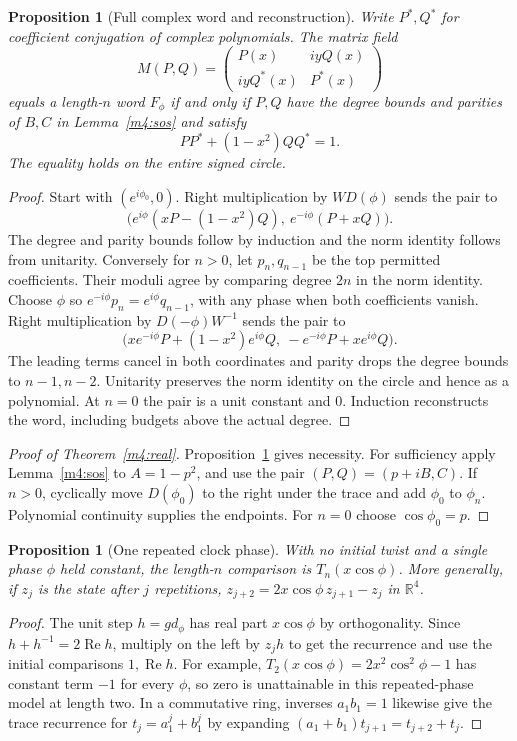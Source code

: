 \documentclass[11pt,reqno]{amsart}
\newtheorem{proposition}[theorem]{Proposition}
\theoremstyle{definition}
\theoremstyle{remark}
\numberwithin{equation}{section}
\newcommand{\R}{\mathbb{R}}
\newcommand{\re}{\operatorname{Re}}
\begin{document}
\begin{proposition}[Full complex word and reconstruction]\label{m4:pair}
Write $P^*,Q^*$ for coefficient conjugation of complex polynomials. The matrix field
\[
 M(P,Q)=\begin{pmatrix}P(x)&iyQ(x)\\iyQ^*(x)&P^*(x)\end{pmatrix}
\]
equals a length-$n$ word $F_\phi$ if and only if $P,Q$ have the degree bounds and parities of $B,C$ in Lemma~\ref{m4:sos} and satisfy
\[
 PP^*+(1-x^2)QQ^*=1.
\]
The equality holds on the entire signed circle.
\end{proposition}
\begin{proof}
Start with $(e^{i\phi_0},0)$. Right multiplication by $WD(\phi)$ sends the pair to
\[
 \big(e^{i\phi}(xP-(1-x^2)Q),\ e^{-i\phi}(P+xQ)\big).
\]
The degree and parity bounds follow by induction and the norm identity follows from unitarity. Conversely for $n>0$, let $p_n,q_{n-1}$ be the top permitted coefficients. Their moduli agree by comparing degree $2n$ in the norm identity. Choose $\phi$ so $e^{-i\phi}p_n=e^{i\phi}q_{n-1}$, with any phase when both coefficients vanish. Right multiplication by $D(-\phi)W^{-1}$ sends the pair to
\[
 \big(xe^{-i\phi}P+(1-x^2)e^{i\phi}Q,\ -e^{-i\phi}P+xe^{i\phi}Q\big).
\]
The leading terms cancel in both coordinates and parity drops the degree bounds to $n-1,n-2$. Unitarity preserves the norm identity on the circle and hence as a polynomial. At $n=0$ the pair is a unit constant and $0$. Induction reconstructs the word, including budgets above the actual degree.
\end{proof}

\begin{proof}[Proof of Theorem~\ref{m4:real}]
Proposition~\ref{m4:pair} gives necessity. For sufficiency apply Lemma~\ref{m4:sos} to $A=1-p^2$, and use the pair $(P,Q)=(p+iB,C)$. If $n>0$, cyclically move $D(\phi_0)$ to the right under the trace and add $\phi_0$ to $\phi_n$. Polynomial continuity supplies the endpoints. For $n=0$ choose $\cos\phi_0=p$.
\end{proof}

\begin{proposition}[One repeated clock phase]\label{m4:repeated}
With no initial twist and a single phase $\phi$ held constant, the length-$n$ comparison is $T_n(x\cos\phi)$. More generally, if $z_j$ is the state after $j$ repetitions, $z_{j+2}=2x\cos\phi\,z_{j+1}-z_j$ in $\R^4$.
\end{proposition}
\begin{proof}
The unit step $h=gd_\phi$ has real part $x\cos\phi$ by orthogonality. Since $h+h^{-1}=2\re h$, multiply on the left by $z_jh$ to get the recurrence and use the initial comparisons $1,\re h$. For example, $T_2(x\cos\phi)=2x^2\cos^2\phi-1$ has constant term $-1$ for every $\phi$, so zero is unattainable in this repeated-phase model at length two. In a commutative ring, inverses $a_1b_1=1$ likewise give the trace recurrence for $t_j=a_1^j+b_1^j$ by expanding $(a_1+b_1)t_{j+1}=t_{j+2}+t_j$.
\end{proof}
\end{document}
